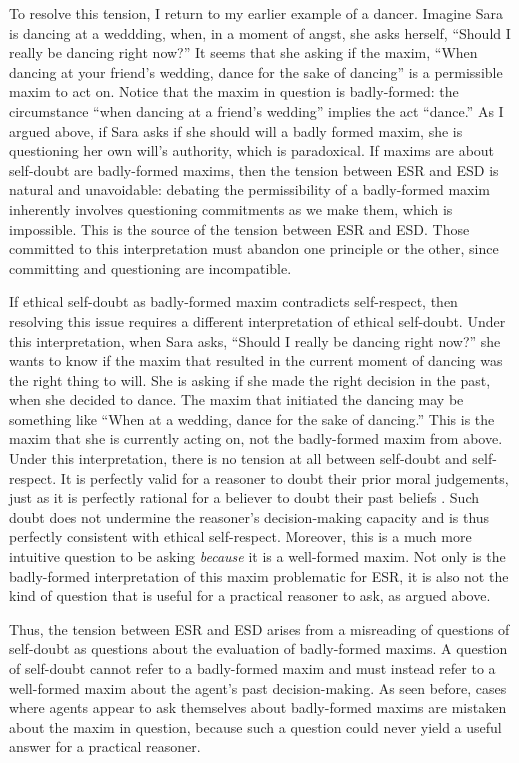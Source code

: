 \begin{isabellebody}
\begin{isamarkuptext}
To resolve this tension, I return to my earlier example of a dancer. Imagine Sara is dancing at a 
weddding, when, in a moment of angst, she asks herself, ``Should I really be dancing right now?'' 
It seems that she asking if the maxim, ``When dancing at your friend's wedding, dance for the sake 
of dancing'' is a permissible maxim to act on. Notice that the maxim in question is badly-formed: the 
circumstance ``when dancing at a friend's wedding'' implies the act ``dance.'' As I argued above, if 
Sara asks if she should will a badly formed maxim, she is questioning her own will's authority, which
is paradoxical. If maxims are about self-doubt are badly-formed maxims, then the tension between ESR
and ESD is natural and unavoidable: debating the permissibility of a badly-formed maxim inherently
involves questioning commitments as we make them, which is impossible. This is the source of the 
tension between ESR and ESD. Those committed to this 
interpretation must abandon one principle or the other, since committing and questioning are incompatible.

If ethical self-doubt as badly-formed maxim contradicts self-respect, then resolving this issue requires a 
different interpretation of ethical self-doubt. Under this interpretation, 
when Sara asks, ``Should I really be dancing right now?'' she wants to know if the maxim that 
resulted in the current moment of dancing was the right thing to will. She is 
asking if she made the right decision in the past, when she decided to dance. The maxim that initiated 
the dancing may be something like ``When at a wedding, dance for the sake of dancing.'' This is the maxim 
that she is currently acting on, not the badly-formed maxim  from above. Under this interpretation, 
there is no tension at all between self-doubt and self-respect. It is perfectly valid for a reasoner 
to doubt their prior moral judgements, just as it is perfectly rational for a believer to doubt their 
past beliefs \cite[3-4]{christensen}. Such doubt does not undermine the reasoner's decision-making 
capacity and is thus perfectly consistent with ethical self-respect. Moreover, this is a much more 
intuitive question to be asking \emph{because} it is a well-formed maxim. Not only is the badly-formed
interpretation of this maxim problematic for ESR, it is also not the kind of question that is useful for a practical
reasoner to ask, as argued above.

Thus, the tension between ESR and ESD arises from a misreading of questions of self-doubt as questions about 
the evaluation of badly-formed maxims. A question of self-doubt cannot refer to a badly-formed maxim and must 
instead refer to a well-formed maxim about the agent's past decision-making. As seen before, cases where 
agents appear to ask themselves about badly-formed maxims are mistaken about the maxim in question, because 
such a question could never yield a useful answer for a practical reasoner. 


\end{isamarkuptext}
\end{isabellebody}
